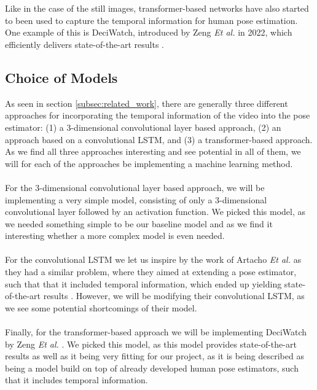 \documentclass[./main.tex]{subfiles}
\begin{document}
\\
\\
Like in the case of the still images, transformer-based networks have also started to been used to capture the temporal information for human pose estimation. One example of this is DeciWatch, introduced by Zeng \textit{Et al.} in 2022, which efficiently delivers state-of-the-art results \cite{https://doi.org/10.48550/arxiv.2203.08713}.

\subsection{Choice of Models}
\label{sec:model_choice}
As seen in section \ref{subsec:related_work}, there are generally three different approaches for incorporating the temporal information of the video into the pose estimator: (1) a 3-dimensional convolutional layer based approach, (2) an approach based on a convolutional LSTM, and (3) a transformer-based approach. As we find all three approaches interesting and see potential in all of them, we will for each of the approaches be implementing a machine learning method.
\\
\\
For the 3-dimensional convolutional layer based approach, we will be implementing a very simple model, consisting of only a 3-dimensional convolutional layer followed by an activation function. We picked this model, as we needed something simple to be our baseline model and as we find it interesting whether a more complex model is even needed.
\\
\\
For the convolutional LSTM we let us inspire by the work of Artacho \textit{Et al.} as they had a similar problem, where they aimed at extending a pose estimator, such that that it included temporal information, which ended up yielding state-of-the-art results \cite{https://doi.org/10.48550/arxiv.2001.08095}. However, we will be modifying their convolutional LSTM, as we see some potential shortcomings of their model.
\\
\\
Finally, for the transformer-based approach we will be implementing DeciWatch by Zeng \textit{Et al.} \cite{https://doi.org/10.48550/arxiv.2203.08713}. We picked this model, as this model provides state-of-the-art results as well as it being very fitting for our project, as it is being described as being a model build on top of already developed human pose estimators, such that it includes temporal information.
\end{document}
